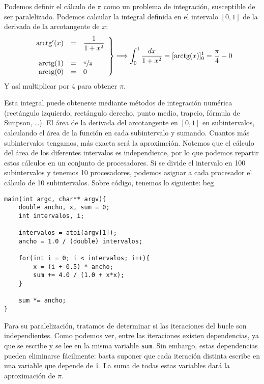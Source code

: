 Podemos definir el cálculo de $\pi$ como un problema de integración, susceptible de ser paralelizado. Podemos calcular la integral definida en el intervalo $[0,1]$ de la derivada de la arcotangente de $x$:
\begin{equation*}
    \left.\begin{array}{rcl}
        \text{arctg}'(x) & = & \dfrac{1}{1+x^2} \\
                  & & \\
        \text{arctg}(1) & = & \nicefrac{\pi}{4} \\
        \text{arctg}(0) & = & 0 
    \end{array}\right\} \Longrightarrow \int_{0}^{1} \dfrac{dx}{1+x^2} = [\text{arctg}(x)]_0^1 = \dfrac{\pi}{4} - 0
\end{equation*}
Y así multiplicar por 4 para obtener $\pi$.

Esta integral puede obtenerse mediante métodos de integración numérica (rectángulo izquierdo, rectángulo derecho, punto medio, trapcio, fórmula de Simpson, \ldots). El área de la derivada del arcotangente en $[0,1]$ en subintervalos, calculando el área de la función en cada subintervalo y sumando. Cuantos más subintervalos tengamos, más exacta será la aproximción.
Notemos que el cálculo del área de los diferentes intervalos es independiente, por lo que podemos repartir estos cálculos en un conjunto de procesadores. Si se divide el intervalo en 100 subintervalos y tenemos 10 procesadores, podemos asignar a cada procesador el cálculo de 10 subintervalos. Sobre código, tenemos lo siguiente:
beg
    \begin{verbatim}
main(int argc, char** argv){
    double ancho, x, sum = 0;
    int intervalos, i;

    intervalos = atoi(argv[1]);
    ancho = 1.0 / (double) intervalos;

    for(int i = 0; i < intervalos; i++){
        x = (i + 0.5) * ancho;
        sum += 4.0 / (1.0 + x*x);
    }

    sum *= ancho;
}
    \end{verbatim}
Para su paralelización, tratamos de determinar si las iteraciones del bucle son independientes. Como podemos ver, entre las iteraciones existen dependencias, ya que se escribe y se lee en la misma variable \verb|sum|. Sin embargo, estas dependencias pueden eliminarse fácilmente: basta suponer que cada iteración distinta escribe en una variable que depende de \verb|i|. La suma de todas estas variables dará la aproximación de $\pi$. 

